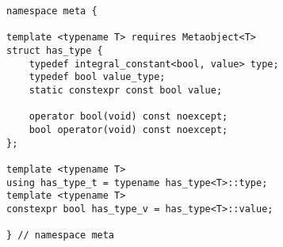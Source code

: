 
\begin{verbatim}
namespace meta {

template <typename T> requires Metaobject<T>
struct has_type {
	typedef integral_constant<bool, value> type;
	typedef bool value_type;
	static constexpr const bool value;

	operator bool(void) const noexcept;
	bool operator(void) const noexcept;
};

template <typename T>
using has_type_t = typename has_type<T>::type;
template <typename T>
constexpr bool has_type_v = has_type<T>::value;

} // namespace meta
\end{verbatim}
